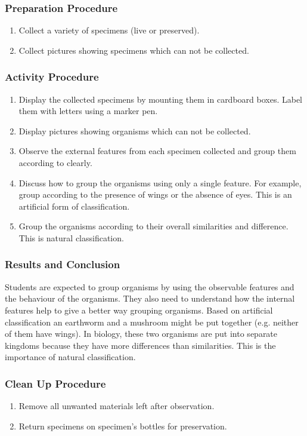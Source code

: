 \subsubsection*{Preparation Procedure}
\begin{enumerate}
\item{Collect a variety of specimens (live or preserved).}
\item{Collect pictures showing specimens which can not be collected.}
\end{enumerate}

\subsubsection*{Activity Procedure}
\begin{enumerate}
\item{Display the collected specimens by mounting them in cardboard boxes. Label them with letters using a marker pen.}
\item{Display pictures showing organisms which can not be collected.}
\item{Observe the external features from each specimen collected and group them according to clearly.}
\item{Discuss how to group the organisms using only a single feature. For example, group according to the presence of wings or the absence of eyes. This is an artificial form of classification.}
\item{Group the organisms according to their overall similarities and difference. This is natural classification.}
\end{enumerate}

\subsubsection*{Results and Conclusion}
Students are expected to group organisms by using the observable features and the behaviour of the organisms. They also need to understand how the internal features help to give a better way grouping organisms. Based on artificial classification an earthworm and a mushroom might be put together (e.g. neither of them have wings). In biology, these two organisms are put into separate kingdoms because they have more differences than similarities. This is the importance of natural classification.

\subsubsection*{Clean Up Procedure}
\begin{enumerate}
\item{Remove all unwanted materials left after observation.}
\item{Return specimens on specimen's bottles for preservation.}
\end{enumerate}

